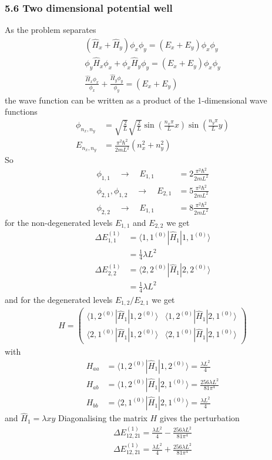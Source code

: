\documentclass[10pt,a4paper]{article}
\theoremstyle{definition}
\begin{document}
\subsubsection{5.6 Two dimensional potential well}
As the problem separates 
\begin{align}
\left(\hat{H}_x+\hat{H}_y\right)\phi_x\phi_y=(E_x+E_y)\phi_x\phi_y\\
\phi_y\hat{H}_x\phi_x+\phi_x\hat{H}_y\phi_y=(E_x+E_y)\phi_x\phi_y\\
\frac{\hat{H}_x\phi_x}{\phi_x}+\frac{\hat{H}_y\phi_y}{\phi_y}=(E_x+E_y)
\end{align}
the wave function can be written as a product of the 1-dimensional wave functions
\begin{align}
\phi_{n_x,n_y}&=\sqrt{\frac{2}{L}}\sqrt{\frac{2}{L}}\sin\left(\frac{n_x\pi}{L}x\right)\sin\left(\frac{n_y\pi}{L}y\right)\\
E_{n_x,n_y}&=\frac{\pi^2\hbar^2}{2mL^2}(n_x^2+n_y^2)
\end{align}
So 
\begin{align}
\phi_{1,1}\quad\rightarrow\quad E_{1,1}&=2\frac{\pi^2\hbar^2}{2mL^2}\\
\phi_{2,1},\phi_{1,2}\quad\rightarrow\quad E_{2,1}&=5\frac{\pi^2\hbar^2}{2mL^2}\\
\phi_{2,2}\quad\rightarrow\quad E_{1,1}&=8\frac{\pi^2\hbar^2}{2mL^2}
\end{align}
for the non-degenerated levels $E_{1,1}$ and $E_{2,2}$ we get
\begin{align}
\Delta E_{1,1}^{(1)}&=\langle 1,1^{(0)}|\hat{H}_1|1,1^{(0)}\rangle\\
&=\frac{1}{4}\lambda L^2\\
\Delta E_{2,2}^{(1)}&=\langle 2,2^{(0)}|\hat{H}_1|2,2^{(0)}\rangle\\
&=\frac{1}{4}\lambda L^2
\end{align}
and for the degenerated levels $E_{1,2}/E_{2,1}$ we get
\begin{align}
H=
\begin{pmatrix}
\langle 1,2^{(0)}|\hat{H}_1|1,2^{(0)}\rangle & \langle 1,2^{(0)}|\hat{H}_1|2,1^{(0)}\rangle\\
\langle 2,1^{(0)}|\hat{H}_1|1,2^{(0)}\rangle & \langle 2,1^{(0)}|\hat{H}_1|2,1^{(0)}\rangle
\end{pmatrix}
\end{align}
with
\begin{align}
H_{aa}&=\langle 1,2^{(0)}|\hat{H}_1|1,2^{(0)}\rangle=\frac{\lambda L^2}{4}\\
H_{ab}&=\langle 1,2^{(0)}|\hat{H}_1|2,1^{(0)}\rangle=\frac{256\lambda L^2}{81\pi^4}\\
H_{bb}&=\langle 2,1^{(0)}|\hat{H}_1|2,1^{(0)}\rangle=\frac{\lambda L^2}{4}
\end{align}
and $\hat{H}_1=\lambda x y$ Diagonalising the matrix $H$ gives the perturbation
\begin{align}
\Delta E_{12,21}^{(1)}=\frac{\lambda L^2}{4}-\frac{256\lambda L^2}{81\pi^4}\\
\Delta E_{12,21}^{(1)}=\frac{\lambda L^2}{4}+\frac{256\lambda L^2}{81\pi^4}\\
\end{align}
\end{document}
